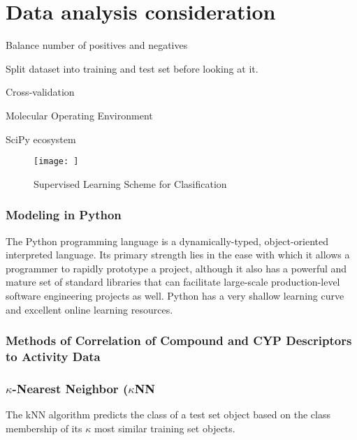 \section{Data analysis consideration}
\begin{description}
\item Balance number of positives and negatives

\item Split dataset into training and test set before looking at it.

\item Cross-validation
\end{description}

\begin{description}
\item Molecular Operating Environment
\item SciPy ecosystem

\end{description}



\begin{figure}[h,t]
  \caption{Supervised Learning Scheme for Clasification}
  \centering
   \texttt{[image: ]}
\end{figure}

\subsubsection{Modeling in Python}
The Python programming language is a dynamically-typed, object-oriented interpreted language. Its primary strength lies in the ease with which it allows a programmer to rapidly prototype a project, although it also has a powerful and mature set of standard libraries that can facilitate large-scale production-level software engineering projects as well. Python has a very shallow learning curve and excellent online learning resources.


\subsubsection{Methods of Correlation of Compound and CYP Descriptors to Activity Data}

\subsubsection{$\kappa$-Nearest Neighbor ($\kappa$NN}
The kNN algorithm predicts the class of a test set object based on the class membership of its $\kappa$ most similar training set objects. \cite{Lapins2013}

